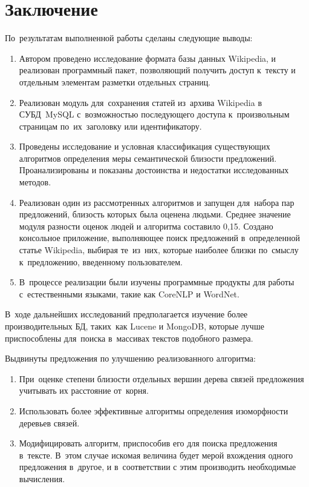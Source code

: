 \section*{Заключение}

По~результатам выполненной работы сделаны следующие выводы:

\begin{enumerate}
\item {
Автором проведено исследование формата базы данных Wikipedia,
и реализован программный пакет, позволяющий получить доступ к~тексту
и отдельным элементам разметки отдельных страниц.
}
\item {
Реализован модуль для~сохранения статей из~архива Wikipedia
в СУБД~MySQL с~возможностью последующего доступа к~произвольным страницам
по~их~заголовку или идентификатору. 
}
\item {
Проведены исследование и условная классификация существующих 
алгоритмов определения меры семантической близости предложений. 
Проанализированы и показаны достоинства и недостатки исследованных методов.
}
\item {
Реализован один из рассмотренных алгоритмов и запущен для~набора 
пар предложений, близость которых была оценена людьми. 
Среднее значение модуля разности оценок людей и алгоритма составило 0,15.
Создано консольное приложение, выполняющее поиск предложений 
в~определенной статье Wikipedia, выбирая те~из~них,
которые наиболее близки по~смыслу к~предложению, введенному пользователем.
}
\item {
В~процессе реализации были изучены программные продукты для работы
с~естественными языками, такие как CoreNLP и WordNet.
} 
\end{enumerate}

В~ходе дальнейших исследований предполагается изучение более производительных БД, таких~как 
Lucene и MongoDB, которые лучше приспособлены для~поиска в~массивах текстов подобного размера.

Выдвинуты предложения по улучшению реализованного алгоритма:

\begin{enumerate}
\item{
При~оценке степени близости отдельных вершин дерева связей предложения учитывать 
их расстояние от~корня.
}
\item{
Использовать более эффективные алгоритмы определения изоморфности деревьев связей.
}
\item{
Модифицировать алгоритм, приспособив его для поиска предложения в~тексте.
В~этом случае искомая величина будет мерой вхождения одного предложения в~другое,
и в~соответствии с этим производить необходимые вычисления.
}
\end{enumerate}
